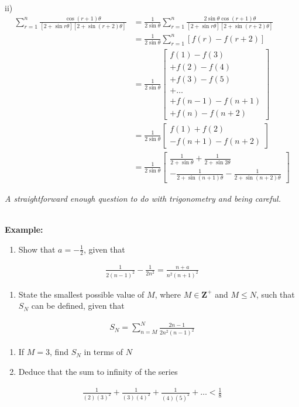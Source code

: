 \documentclass[12pt, a4paper, titlepage]{article}
\begin{document}
ii)
\begin{align*}
    \sum ^n_{r = 1} \frac{\cos (r+1)\theta}{[2 + \sin r\theta][2 + \sin (r + 2)\theta]} &= \frac{1}{2\sin\theta} \sum^n_{r = 1} \frac{2\sin \theta \cos (r+1)\theta}{[2 + \sin r\theta][2 + \sin (r + 2)\theta]} \\
    &= \frac{1}{2\sin\theta} \sum^n_{r = 1} [f(r) - f(r + 2)] \\
    &= \frac{1}{2\sin\theta} \left[
    \begin{array}{c}
        f(1) - f(3) \\
        + f(2) - f(4) \\
        + f(3) - f(5) \\
        + \dots \\
        + f(n - 1) - f(n + 1) \\
        + f(n) - f(n + 2)
    \end{array}
    \right] \\
    &= \frac{1}{2\sin\theta} \left[
    \begin{array}{c}
         f(1) + f(2) \\
         - f(n + 1) - f(n + 2)
    \end{array}
    \right] \\
    &= \frac{1}{2\sin\theta} \left[
    \begin{array}{c}
         \frac{1}{2 + \sin \theta} + \frac{1}{2 + \sin 2\theta} \\
         - \frac{1}{2 + \sin (n + 1)\theta} - \frac{1}{2 + \sin (n + 2)\theta}
    \end{array}
    \right]
\end{align*}

\emph{A straightforward enough question to do with trigonometry and being careful.}

\textbf{\\ Example:}

\begin{enumerate}[label=(\roman*)]
    \item Show that $a = -\frac{1}{2}$, given that
\end{enumerate}
\begin{align*}
    \frac{1}{2(n - 1)^2} - \frac{1}{2n^2} = \frac{n + a}{n^2(n + 1)^2}
\end{align*}
\begin{enumerate}[resume, label=(\roman*)]
    \item State the smallest possible value of $M$, where $M \in \mathbf{Z}^{+}$ and $M \leq N$, such that $S_N$ can be defined, given that
\end{enumerate}
\begin{align*}
    S_N = \sum_{n = M}^N \frac{2n - 1}{2n^2(n - 1)^2}
\end{align*}
\begin{enumerate}[resume, label=(\roman*)]
    \item If $M = 3$, find $S_N$ in terms of $N$
    \item Deduce that the sum to infinity of the series
\end{enumerate}
\begin{align*}
    \frac{1}{(2)(3)^2} + \frac{1}{(3)(4)^2} + \frac{1}{(4)(5)^2} + \dots < \frac{1}{8}
\end{align*}
\end{document}
